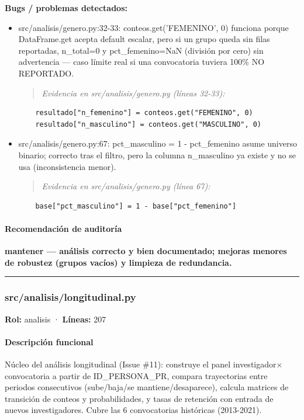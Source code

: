 \begin{tcolorbox}[riesgo]
\textbf{Bugs / problemas detectados:}
\begin{itemize}
  \item src/analisis/genero.py:32-33: conteos.get('FEMENINO', 0) funciona porque DataFrame.get acepta default escalar, pero si un grupo queda sin filas reportadas, n\_total=0 y pct\_femenino=NaN (división por cero) sin advertencia --- caso límite real si una convocatoria tuviera 100\% NO REPORTADO.
\begin{quote}\footnotesize\ttfamily
\noindent\emph{Evidencia en src/analisis/genero.py (líneas 32-33):}
\end{quote}
\begin{lstlisting}
    resultado["n_femenino"] = conteos.get("FEMENINO", 0)
    resultado["n_masculino"] = conteos.get("MASCULINO", 0)
\end{lstlisting}

  \item src/analisis/genero.py:67: pct\_masculino = 1 - pct\_femenino asume universo binario; correcto tras el filtro, pero la columna n\_masculino ya existe y no se usa (inconsistencia menor).
\begin{quote}\footnotesize\ttfamily
\noindent\emph{Evidencia en src/analisis/genero.py (línea 67):}
\end{quote}
\begin{lstlisting}
    base["pct_masculino"] = 1 - base["pct_femenino"]
\end{lstlisting}

\end{itemize}
\end{tcolorbox}

\paragraph{Recomendación de auditoría}
\textbf{mantener --- análisis correcto y bien documentado; mejoras menores de robustez (grupos vacíos) y limpieza de redundancia.}

\medskip
\hrule

\subsubsection{src/analisis/longitudinal.py}
\textbf{Rol:} analisis · \textbf{Líneas:} 207

\paragraph{Descripción funcional}
Núcleo del análisis longitudinal (Issue \#11): construye el panel investigador$\times$convocatoria a partir de ID\_PERSONA\_PR, compara trayectorias entre periodos consecutivos (sube/baja/se mantiene/desaparece), calcula matrices de transición de conteos y probabilidades, y tasas de retención con entrada de nuevos investigadores. Cubre las 6 convocatorias históricas (2013-2021).


